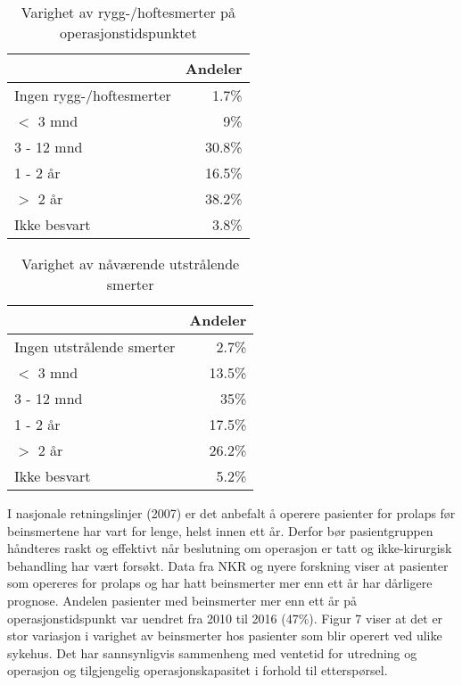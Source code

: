 \documentclass [norsk,a4paper,twoside]{article}\usepackage[]{graphicx}\usepackage[]{color}
\begin{document}
\begin{table}[ht]
\centering
\begin{tabular}{lr}
  \hline
 & Andeler \\ 
  \hline
Ingen rygg-/hoftesmerter & 1.7\% \\ 
  $<$ 3 mnd & 9\% \\ 
  3 - 12 mnd & 30.8\% \\ 
  1 - 2 år & 16.5\% \\ 
  $>$ 2 år & 38.2\% \\ 
  Ikke besvart & 3.8\% \\ 
   \hline
\end{tabular}
\caption{Varighet av rygg-/hoftesmerter på operasjonstidspunktet} 
\label{tab:SmRH}
\end{table}
\begin{table}[ht]
\centering
\begin{tabular}{lr}
  \hline
 & Andeler \\ 
  \hline
Ingen utstrålende smerter & 2.7\% \\ 
  $<$ 3 mnd & 13.5\% \\ 
  3 - 12 mnd & 35\% \\ 
  1 - 2 år & 17.5\% \\ 
  $>$ 2 år & 26.2\% \\ 
  Ikke besvart & 5.2\% \\ 
   \hline
\end{tabular}
\caption{Varighet av nåværende utstrålende smerter} 
\label{tab:Utstr}
\end{table}

I nasjonale retningslinjer (2007) er det anbefalt å operere pasienter for prolaps før
beinsmertene har vart for lenge, helst innen ett år. Derfor bør
pasientgruppen håndteres raskt og effektivt når beslutning om operasjon er tatt og
ikke-kirurgisk behandling har vært forsøkt. Data fra NKR og nyere forskning viser at
pasienter som opereres for prolaps og har hatt beinsmerter mer enn ett år har
dårligere prognose. Andelen pasienter med beinsmerter mer enn ett år på
operasjonstidspunkt var uendret fra 2010 til 2016 (47\%).
Figur 7 viser at det er stor variasjon i varighet av beinsmerter hos pasienter som blir
operert ved ulike sykehus. Det har sannsynligvis sammenheng med ventetid for
utredning og operasjon og tilgjengelig operasjonskapasitet i forhold til etterspørsel.
\end{document}
